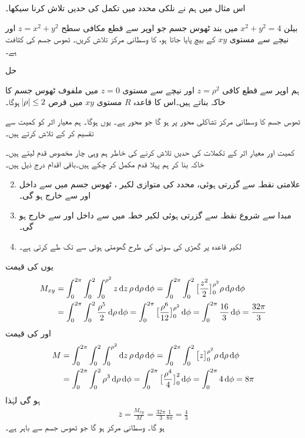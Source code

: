 اس مثال میں ہم نے نلکی محدد میں تکمل کی حدیں تلاش کرنا سیکھا۔


بیلن
\(x^2+y^2=4\)
 میں بند ٹھوس جسم  جو اوپر سے  قطع مکافی سطح 
\(z=x^2+y^2\)
اور نیچے سے مستوی
\(xy\)
 کے بیچ پایا جاتا ہو، کا وسطانی مرکز تلاش  کریں۔ ٹھوس جسم کی کثافت  ہے۔


حل


ہم اوپر سے قطع کافی
\(z = \rho^2\)
 اور نیچے سے مستوی
\(z=0\)
 میں ملفوف ٹھوس جسم  کا خاکہ بناتے ہیں۔اس کا قاعدہ  
\(R\)
 مستوی
\(xy\)
 میں قرص
\(\abs{\rho}\le 2\)
 ہوگا۔


ٹھوس جسم کا وسطانی مرکز  تشاکلی محور پر ہو گا جو محور  ہے۔ یوں  ہوگا۔ ہم معیار اثر  کو کمیت  سے تقسیم کر کے   تلاش کرتے ہیں۔


کمیت اور معیار اثر کے تکملات کی حدیں تلاش کرنے کی خاطر  ہم وہی چار مخصوص قدم لیتے ہیں۔  خاکہ بنا  کر ہم پہلا قدم مکمل کر چکے ہیں۔باقی اقدام  درج ذیل  ہیں۔
\begin{enumerate}
 \setcounter{enumi}{1}
\item
{}\quad
علامتی نقطہ  سے گزرتی ہوئی، محدد  کی متوازی  لکیر ،  ٹھوس جسم میں   سے  داخل اور   سے  خارج ہو گی۔ 
\item
{}\quad
مبدا سے شروع نقطہ  سے گزرتی ہوئی لکیر  خطہ  میں  سے داخل اور  سے خارج ہو گی۔
\item
{}\quad
لکیر  قاعدہ پر گھڑی کی سوئی کی طرح گھومتی  ہوئی     سے   تک طے کرتی ہے۔
\end{enumerate}
یوں  کی قیمت
\begin{align*} 
 M_{xy}&=\int_0^{2\pi}\int_0^{2}\int_0^{\rho^2}z\dif z \,\rho\dif \rho\dif \phi =\int_0^{2\pi}\int_0^2\big[\frac{z^2}{2}\big]_{0}^{\rho^2} \rho\dif \rho\dif \phi\\
&=\int_0^{2\pi}\int_0^2\frac{\rho^5}{2}\dif \rho\dif \phi=\int_0^{2\pi}\big[\frac{\rho^6}{12}\big]_0^{\rho^2}\dif \phi=\int_0^{2\pi}\frac{16}{3}\dif\phi=\frac{32\pi}{3}
\end{align*}
اور  کی قیمت
\begin{align*}
M&=\int_0^{2\pi}\int_0^2\int_0^{\rho^2}\dif z \,\rho\dif \rho\dif \phi=\int_0^{2\pi}\int_0^2\big[z\big]_{0}^{\rho^2} \rho\dif \rho\dif \phi\\
&=\int_0^{2\pi}\int_0^2 \rho^3\dif \rho\dif \phi=\int_0^{2\pi}\big[\frac{\rho^4}{4}\big]_0^2\dif\phi=\int_0^{2\pi}4\dif\phi=8\pi
\end{align*}
ہو گی لہٰذا
\begin {align*}
\bar {z}=\frac  {M_{xy}} {M}=\frac{32\pi}{3}\frac{1}{8\pi}=\frac{4}{3}
\end {align*}
ہو گا۔ وسطانی مرکز  ہو گا جو  ٹھوس جسم سے باہر ہے۔

